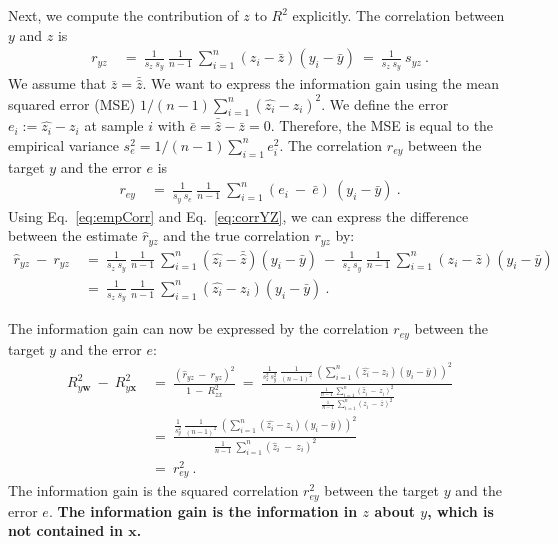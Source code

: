 \documentclass{article}
\newcommand\Bw{\bm{w}}
\newcommand\Bx{\bm{x}}
\begin{document}
\begin{appendices}
Next, we compute the contribution of $z$ to $R^2$ explicitly. 
The correlation between $y$ and $z$ is 
\begin{align}
\label{eq:corrYZ}
  r_{yz}  \ &= \ \frac{1}{s_z \ s_y} \ \frac{1}{n-1} \ \sum_{i=1}^{n}
    (z_i-\bar{z})(y_i-\bar{y}) \ = \ \frac{1}{s_z \ s_y} \ s_{yz} \ . 
\end{align}
We assume that $\bar{z}=\bar{\hat{z}}$.
We want to express the information gain using the mean squared error (MSE)
$1/(n-1) \sum_{i=1}^n (\hat{z_i}- z_i)^2$.
We define the error $e_i:= \hat{z_i}- z_i$ at sample $i$ 
with $\bar{e} =  \bar{\hat{z}} - \bar{z} = 0$. Therefore,
the MSE is equal to the empirical variance
$s_e^2 = 1/(n-1) \sum_{i=1}^n e_i^2$.
The correlation $r_{ey}$ between the target $y$ and the
error $e$ is
\begin{align}
  r_{ey} \ &= \ \frac{1}{s_y \ s_e}\ \frac{1}{n-1}\ \sum_{i=1}^{n}
    (e_i \ - \ \bar{e}) \ (y_i-\bar{y}) \ .
\end{align}
Using Eq.~\eqref{eq:empCorr} and Eq.~\eqref{eq:corrYZ},
we can express the difference between the estimate $\hat{r}_{yz}$ and
the true correlation $r_{yz}$ by:
\begin{align}
  \hat{r}_{yz} \ - \ r_{yz}  \ &= \ \frac{1}{s_z \ s_y} \ \frac{1}{n-1} \ \sum_{i=1}^{n}
    (\hat{z_i}-\bar{\hat{z}})(y_i-\bar{y})  \ - \ \frac{1}{s_z \ s_y} \ \frac{1}{n-1} \ \sum_{i=1}^{n}
  (z_i-\bar{z})(y_i-\bar{y}) \\ \nonumber
  &= \ \frac{1}{s_z \ s_y} \ \frac{1}{n-1} \ \sum_{i=1}^{n}
    (\hat{z_i}- z_i)(y_i-\bar{y}) \ .
\end{align}

The information gain can now be expressed by
the correlation $r_{ey}$ between the target $y$ and the
error $e$:
\begin{align}
  R^2_{y\Bw} \ - \ R^2_{y\Bx} \ &= \
  \frac{(\hat{r}_{yz} \ - \ r_{yz})^2}{1 \ - \ R^2_{zx}} \ = \
  \frac{\frac{1}{s_z^2 \ s_y^2} \ \frac{1}{(n-1)^2} \ \left( \sum_{i=1}^{n}
    (\hat{z_i}- z_i)(y_i-\bar{y}) \right)^2}
  {\frac{\frac{1}{n-1}\ \sum_{i=1}^n \left( \hat{z}_i \ - \ z_i
  \right)^2}{\frac{1}{n-1}\ \sum_{i=1}^n \left( z_i \ - \ \bar{z}
  \right)^2}} \\ \nonumber
  &= \ \frac{\frac{1}{s_y^2} \ \frac{1}{(n-1)^2} \ \left( \sum_{i=1}^{n}
    (\hat{z_i}- z_i)(y_i-\bar{y}) \right)^2}
  {\frac{1}{n-1}\ \sum_{i=1}^n \left( \hat{z}_i \ - \ z_i \right)^2} \\ \nonumber
  &= \ r_{ey}^2 \ .
\end{align}
The information gain is the squared
correlation $r_{ey}^2$ between the target $y$ and the
error $e$.
{\bf The information gain is the information in $z$ about $y$, which is
not contained in $\Bx$.}



\end{appendices}
\end{document}
